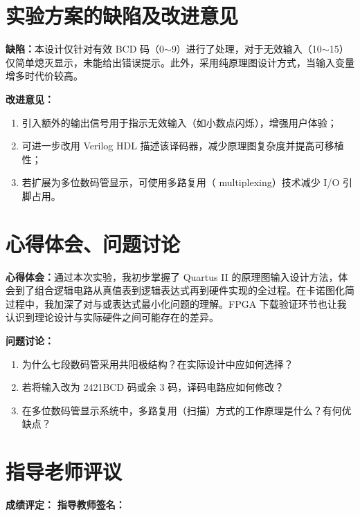 \documentclass[12pt, a4paper]{article}
\begin{document}
\section*{实验方案的缺陷及改进意见}

\textbf{缺陷：}本设计仅针对有效 BCD 码（0$\sim$9）进行了处理，对于无效输入（10$\sim$15）仅简单熄灭显示，未能给出错误提示。此外，采用纯原理图设计方式，当输入变量增多时代价较高。

\textbf{改进意见：}
\begin{enumerate}
\item 引入额外的输出信号用于指示无效输入（如小数点闪烁），增强用户体验；
\item 可进一步改用 Verilog HDL 描述该译码器，减少原理图复杂度并提高可移植性；
\item 若扩展为多位数码管显示，可使用多路复用（ multiplexing）技术减少 I/O 引脚占用。
\end{enumerate}

\section*{心得体会、问题讨论}

\textbf{心得体会：}通过本次实验，我初步掌握了 Quartus II 的原理图输入设计方法，体会到了组合逻辑电路从真值表到逻辑表达式再到硬件实现的全过程。在卡诺图化简过程中，我加深了对与或表达式最小化问题的理解。FPGA 下载验证环节也让我认识到理论设计与实际硬件之间可能存在的差异。

\textbf{问题讨论：}

\begin{enumerate}
\item 为什么七段数码管采用共阳极结构？在实际设计中应如何选择？
\item 若将输入改为 2421BCD 码或余 3 码，译码电路应如何修改？
\item 在多位数码管显示系统中，多路复用（扫描）方式的工作原理是什么？有何优缺点？
\end{enumerate}

\vspace{20mm}

\section*{指导老师评议}
\vspace{50mm}

\begin{center}
\textbf{成绩评定：} \underline{\hspace{4cm}} \hspace{2cm} \textbf{指导教师签名：} \underline{\hspace{4cm}}
\end{center}
\end{document}
